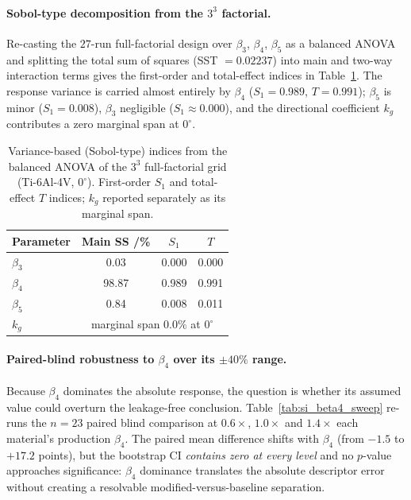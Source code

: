 \documentclass[11pt,a4paper,twocolumn]{article}
\providecommand{\ang}[1]{\ensuremath{#1^{\circ}}}
\begin{document}
\paragraph{Sobol-type decomposition from the $3^3$ factorial.}
Re-casting the $27$-run full-factorial design over $\beta_3$, $\beta_4$, $\beta_5$ as a balanced ANOVA and
splitting the total sum of squares (SST $= 0.02237$) into main and two-way interaction terms gives the
first-order and total-effect indices in Table~\ref{tab:si_sobol}. The response variance is carried almost
entirely by $\beta_4$ ($S_1 = 0.989$, $T = 0.991$); $\beta_5$ is minor ($S_1 = 0.008$), $\beta_3$ negligible
($S_1 \approx 0.000$), and the directional coefficient $k_g$ contributes a zero marginal span at $\ang{0}$.

\begin{table}[htbp]
\centering
\caption{Variance-based (Sobol-type) indices from the balanced ANOVA of the $3^3$ full-factorial grid
(Ti-6Al-4V, $\ang{0}$). First-order $S_1$ and total-effect $T$ indices; $k_g$ reported separately as its
marginal span.}
\label{tab:si_sobol}
\footnotesize
\begin{tabular}{lccc}
\toprule
\textbf{Parameter} & \textbf{Main SS /\%} & $S_1$ & $T$ \\
\midrule
$\beta_3$ & 0.03 & 0.000 & 0.000 \\
$\beta_4$ & 98.87 & 0.989 & 0.991 \\
$\beta_5$ & 0.84 & 0.008 & 0.011 \\
$k_g$ & \multicolumn{3}{c}{marginal span $0.0\%$ at $\ang{0}$} \\
\bottomrule
\end{tabular}
\end{table}

\paragraph{Paired-blind robustness to $\beta_4$ over its $\pm40\%$ range.}
Because $\beta_4$ dominates the absolute response, the question is whether its assumed value could overturn
the leakage-free conclusion. Table~\ref{tab:si_beta4_sweep} re-runs the $n = 23$ paired blind comparison at
$0.6\times$, $1.0\times$ and $1.4\times$ each material's production $\beta_4$. The paired mean difference shifts
with $\beta_4$ (from $-1.5$ to $+17.2$ points), but the bootstrap CI \emph{contains zero at every level} and no
$p$-value approaches significance: $\beta_4$ dominance translates the absolute descriptor error without
creating a resolvable modified-versus-baseline separation.
\end{document}
